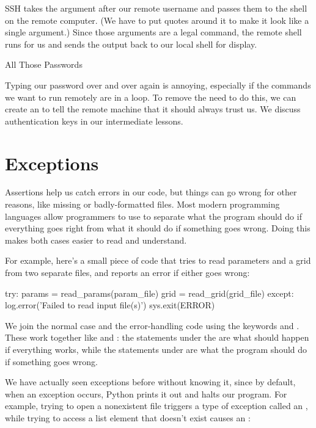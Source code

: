 SSH takes the argument after our remote username and passes them to the
shell on the remote computer. (We have to put quotes around it to make
it look like a single argument.) Since those arguments are a legal
command, the remote shell runs  for us and sends the
output back to our local shell for display.

\begin{swcbox}{All Those Passwords}

Typing our password over and over again is annoying, especially if the
commands we want to run remotely are in a loop. To remove the need to do
this, we can create an  to tell the remote machine that it should always trust us. We
discuss authentication keys in our intermediate lessons.

\end{swcbox}

\section{Exceptions}

Assertions help us catch errors in our code, but things can go wrong for
other reasons, like missing or badly-formatted files. Most modern
programming languages allow programmers to use
 to separate what the program should
do if everything goes right from what it should do if something goes
wrong. Doing this makes both cases easier to read and understand.

For example, here's a small piece of code that tries to read parameters
and a grid from two separate files, and reports an error if either goes
wrong:

\begin{VerbIn}
try:
    params = read_params(param_file)
    grid = read_grid(grid_file)
except:
    log.error('Failed to read input file(s)')
    sys.exit(ERROR)
\end{VerbIn}

We join the normal case and the error-handling code using the keywords
 and . These work together like 
and : the statements under the  are what should
happen if everything works, while the statements under 
are what the program should do if something goes wrong.

We have actually seen exceptions before without knowing it, since by
default, when an exception occurs, Python prints it out and halts our
program. For example, trying to open a nonexistent file triggers a type
of exception called an , while trying to access a list
element that doesn't exist causes an :

